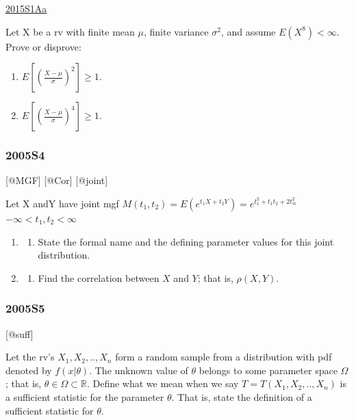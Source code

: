 \documentclass[6pt,twocolumn,Portrait]{article}
\providecommand{\tightlist}{%
  \setlength{\itemsep}{0pt}\setlength{\parskip}{0pt}}
\begin{document}
\protect\hyperlink{s1aa}{2015S1Aa}

Let X be a rv with finite mean \(\mu\), finite variance \(\sigma^2\),
and assume \(E(X^8)<\infty\). Prove or disprove:

\begin{enumerate}
\def\labelenumi{(\alph{enumi})}
\item
  \(E[(\frac{X-\mu}{\sigma})^2]\ge1\).
\item
  \(E[(\frac{X-\mu}{\sigma})^4]\ge1\).
\end{enumerate}

\hypertarget{s4-1}{%
\subsubsection{2005S4}\label{s4-1}}

{[}@MGF{]} {[}@Cor{]} {[}@joint{]}

Let X andY have joint mgf
\(M(t_1,t_2)=E(e^{t_1X + t_2Y})=e^{t_1^2+t_1t_2+2t_@^2}\)
\(-\infty<t_1,t_2<\infty\)

\begin{enumerate}
\def\labelenumi{(\alph{enumi})}
\item
  \begin{enumerate}
  \def\labelenumii{(\arabic{enumii})}
  \setcounter{enumii}{9}
  \tightlist
  \item
    State the formal name and the defining parameter values for this
    joint distribution.
  \end{enumerate}
\item
  \begin{enumerate}
  \def\labelenumii{(\arabic{enumii})}
  \setcounter{enumii}{4}
  \tightlist
  \item
    Find the correlation between \(X\) and \(Y\); that is,
    \(\rho(X, Y)\).
  \end{enumerate}
\end{enumerate}

\hypertarget{s5-1}{%
\subsubsection{2005S5}\label{s5-1}}

{[}@suff{]}

Let the rv's \(X_1,X_2,..,X_n\) form a random sample from a distribution
with pdf denoted by \(f(x|\theta)\). The unknown value of \(\theta\)
belongs to some parameter space \(\Omega\); that is,
\(\theta\in\Omega\subset\mathbb R\). Define what we mean when we say
\(T=T(X_1,X_2,..,X_n)\) is a sufficient statistic for the parameter
\(\theta\). That is, state the definition of a sufficient statistic for
\(\theta\).
\end{document}
